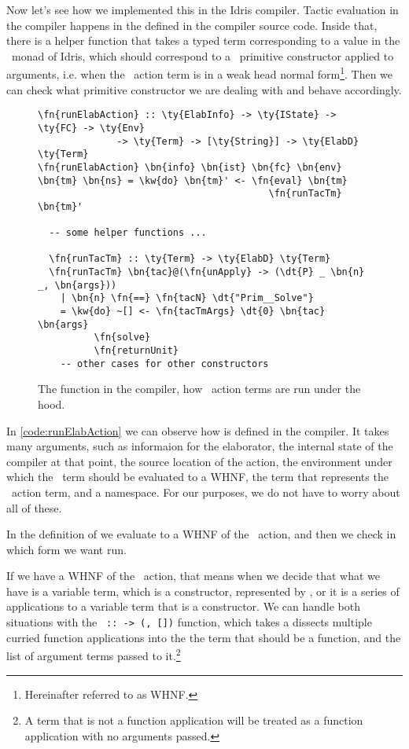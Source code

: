 Now let's see how we implemented this in the Idris compiler. Tactic evaluation
in the compiler happens in the  defined in the compiler
source code. Inside that, there is a helper function  that takes a
typed term corresponding to a value in the \Elab\ monad of Idris, which should
correspond to a \Elab\ primitive constructor applied to arguments, i.e. when
the \Elab\ action term is in a weak head normal form\footnote{Hereinafter referred
to as WHNF.}. Then we can check what primitive constructor we are dealing with
and behave accordingly.

\begin{figure}[ht]
\caption{The  function in the compiler, how \Elab\ action terms are run under the hood.}
\label{code:runElabAction}
\begin{Verbatim}[framesep=2mm, label=\footnotesize{\normalfont{Haskell}}, labelposition=topline]
\fn{runElabAction} :: \ty{ElabInfo} -> \ty{IState} -> \ty{FC} -> \ty{Env}
              -> \ty{Term} -> [\ty{String}] -> \ty{ElabD} \ty{Term}
\fn{runElabAction} \bn{info} \bn{ist} \bn{fc} \bn{env} \bn{tm} \bn{ns} = \kw{do} \bn{tm}' <- \fn{eval} \bn{tm}
                                         \fn{runTacTm} \bn{tm}'

  -- some helper functions ...

  \fn{runTacTm} :: \ty{Term} -> \ty{ElabD} \ty{Term}
  \fn{runTacTm} \bn{tac}@(\fn{unApply} -> (\dt{P} _ \bn{n} _, \bn{args}))
    | \bn{n} \fn{==} \fn{tacN} \dt{"Prim__Solve"}
    = \kw{do} ~[] <- \fn{tacTmArgs} \dt{0} \bn{tac} \bn{args}
          \fn{solve}
          \fn{returnUnit}
    -- other cases for other constructors
\end{Verbatim}
\end{figure}

In \autoref{code:runElabAction} we can observe how  is
defined in the compiler.
It takes many arguments, such as informaion for the elaborator, the internal
state of the compiler at that point, the source location of the action, the
environment under which the \Elab\ term should be evaluated to a WHNF, the
term that represents the \Elab\ action term, and a namespace.  For our purposes,
we do not have to worry about all of these.

In the definition of  we evaluate  to a WHNF
of the \Elab\ action, and then we check in  which form we want run.

If we have a WHNF of the \Elab\ action, that means when we decide
that what we have is a variable term, which is a constructor, represented by
, or it is a series of applications to a variable term that is a
constructor. We can handle both situations with the
\texttt{ ::  -> (, [])} function,
which takes a dissects multiple curried function applications into the the term
that should be a function, and the list of argument terms passed to
it.\footnote{A term that is not a function application will be treated as a
function application with no arguments passed.}

